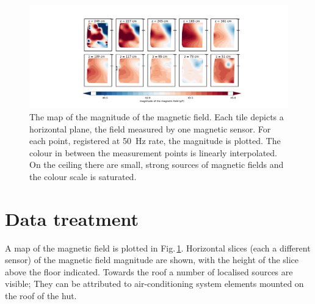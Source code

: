 \begin{figure}
  \centering
  \includegraphics[width=\linewidth]{gfx/mapping/lpsc/bastille_crane_away_rep_magnitude_low_range_crop.pdf}
  \caption{The map of the magnitude of the magnetic field.
  Each tile depicts a horizontal plane, the field measured by one magnetic sensor.
  For each point, registered at \SI{50}{\hertz} rate, the magnitude is plotted. The colour in between the measurement points is linearly interpolated.
  On the ceiling there are small, strong sources of magnetic fields and the colour scale is saturated.}\label{fig:mapping_bastille_magnitude}
\end{figure}




\section{Data treatment}
\label{sec:mapping_lpsc_data_treatment}
A map of the magnetic field is plotted in Fig.\,\ref{fig:mapping_bastille_magnitude}.
Horizontal slices (each a different sensor) of the magnetic field magnitude are shown, with the height of the slice above the floor indicated.
Towards the roof a number of localised sources are visible;
They can be attributed to air-conditioning system elements mounted on the roof of the hut.

